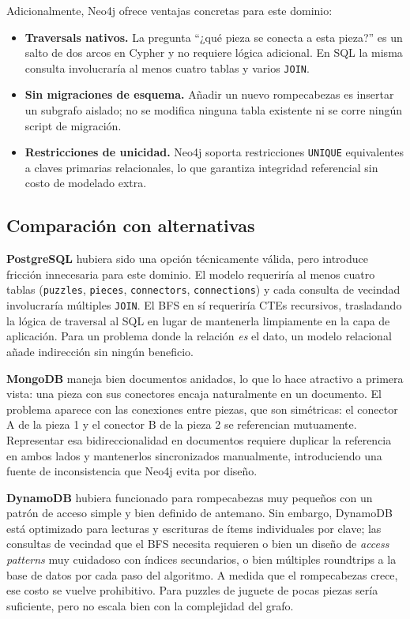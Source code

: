 \documentclass[12pt,a4paper]{article}
\begin{document}
Adicionalmente, Neo4j ofrece ventajas concretas para este dominio:

\begin{itemize}
    \item \textbf{Traversals nativos.} La pregunta ``¿qué pieza se conecta a
          esta pieza?'' es un salto de dos arcos en Cypher y no requiere lógica
          adicional. En SQL la misma consulta involucraría al menos cuatro tablas
          y varios \texttt{JOIN}.

    \item \textbf{Sin migraciones de esquema.} Añadir un nuevo rompecabezas es
          insertar un subgrafo aislado; no se modifica ninguna tabla existente ni
          se corre ningún script de migración.

    \item \textbf{Restricciones de unicidad.} Neo4j soporta restricciones
          \texttt{UNIQUE} equivalentes a claves primarias relacionales, lo que
          garantiza integridad referencial sin costo de modelado extra.
\end{itemize}

\subsection{Comparación con alternativas}

\textbf{PostgreSQL} hubiera sido una opción técnicamente válida, pero introduce
fricción innecesaria para este dominio. El modelo requeriría al menos cuatro
tablas (\texttt{puzzles}, \texttt{pieces}, \texttt{connectors},
\texttt{connections}) y cada consulta de vecindad involucraría múltiples
\texttt{JOIN}. El BFS en sí requeriría CTEs recursivos, trasladando la lógica
de traversal al SQL en lugar de mantenerla limpiamente en la capa de aplicación.
Para un problema donde la relación \emph{es} el dato, un modelo relacional
añade indirección sin ningún beneficio.

\textbf{MongoDB} maneja bien documentos anidados, lo que lo hace atractivo a
primera vista: una pieza con sus conectores encaja naturalmente en un documento.
El problema aparece con las conexiones entre piezas, que son simétricas: el
conector A de la pieza 1 y el conector B de la pieza 2 se referencian
mutuamente. Representar esa bidireccionalidad en documentos requiere duplicar la
referencia en ambos lados y mantenerlos sincronizados manualmente, introduciendo
una fuente de inconsistencia que Neo4j evita por diseño.

\textbf{DynamoDB} hubiera funcionado para rompecabezas muy pequeños con un
patrón de acceso simple y bien definido de antemano. Sin embargo, DynamoDB
está optimizado para lecturas y escrituras de ítems individuales por clave; las
consultas de vecindad que el BFS necesita requieren o bien un diseño de
\textit{access patterns} muy cuidadoso con índices secundarios, o bien múltiples
roundtrips a la base de datos por cada paso del algoritmo. A medida que el
rompecabezas crece, ese costo se vuelve prohibitivo. Para puzzles de juguete de
pocas piezas sería suficiente, pero no escala bien con la complejidad del grafo.
\end{document}
